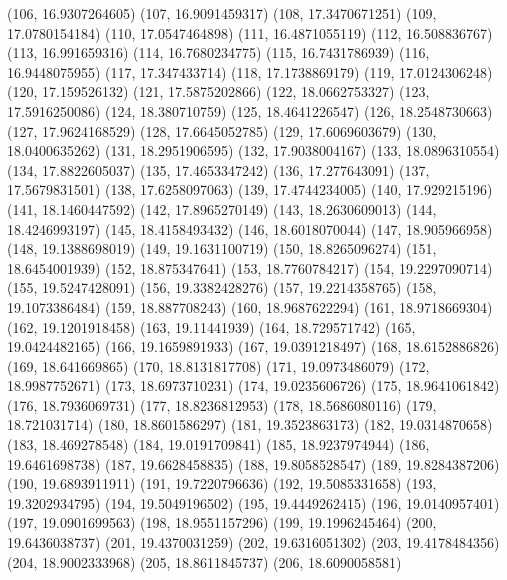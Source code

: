 {					(106, 16.9307264605)
					(107, 16.9091459317)
					(108, 17.3470671251)
					(109, 17.0780154184)
					(110, 17.0547464898)
					(111, 16.4871055119)
					(112, 16.508836767)
					(113, 16.991659316)
					(114, 16.7680234775)
					(115, 16.7431786939)
					(116, 16.9448075955)
					(117, 17.347433714)
					(118, 17.1738869179)
					(119, 17.0124306248)
					(120, 17.159526132)
					(121, 17.5875202866)
					(122, 18.0662753327)
					(123, 17.5916250086)
					(124, 18.380710759)
					(125, 18.4641226547)
					(126, 18.2548730663)
					(127, 17.9624168529)
					(128, 17.6645052785)
					(129, 17.6069603679)
					(130, 18.0400635262)
					(131, 18.2951906595)
					(132, 17.9038004167)
					(133, 18.0896310554)
					(134, 17.8822605037)
					(135, 17.4653347242)
					(136, 17.277643091)
					(137, 17.5679831501)
					(138, 17.6258097063)
					(139, 17.4744234005)
					(140, 17.929215196)
					(141, 18.1460447592)
					(142, 17.8965270149)
					(143, 18.2630609013)
					(144, 18.4246993197)
					(145, 18.4158493432)
					(146, 18.6018070044)
					(147, 18.905966958)
					(148, 19.1388698019)
					(149, 19.1631100719)
					(150, 18.8265096274)
					(151, 18.6454001939)
					(152, 18.875347641)
					(153, 18.7760784217)
					(154, 19.2297090714)
					(155, 19.5247428091)
					(156, 19.3382428276)
					(157, 19.2214358765)
					(158, 19.1073386484)
					(159, 18.887708243)
					(160, 18.9687622294)
					(161, 18.9718669304)
					(162, 19.1201918458)
					(163, 19.11441939)
					(164, 18.729571742)
					(165, 19.0424482165)
					(166, 19.1659891933)
					(167, 19.0391218497)
					(168, 18.6152886826)
					(169, 18.641669865)
					(170, 18.8131817708)
					(171, 19.0973486079)
					(172, 18.9987752671)
					(173, 18.6973710231)
					(174, 19.0235606726)
					(175, 18.9641061842)
					(176, 18.7936069731)
					(177, 18.8236812953)
					(178, 18.5686080116)
					(179, 18.721031714)
					(180, 18.8601586297)
					(181, 19.3523863173)
					(182, 19.0314870658)
					(183, 18.469278548)
					(184, 19.0191709841)
					(185, 18.9237974944)
					(186, 19.6461698738)
					(187, 19.6628458835)
					(188, 19.8058528547)
					(189, 19.8284387206)
					(190, 19.6893911911)
					(191, 19.7220796636)
					(192, 19.5085331658)
					(193, 19.3202934795)
					(194, 19.5049196502)
					(195, 19.4449262415)
					(196, 19.0140957401)
					(197, 19.0901699563)
					(198, 18.9551157296)
					(199, 19.1996245464)
					(200, 19.6436038737)
					(201, 19.4370031259)
					(202, 19.6316051302)
					(203, 19.4178484356)
					(204, 18.9002333968)
					(205, 18.8611845737)
					(206, 18.6090058581)
}
